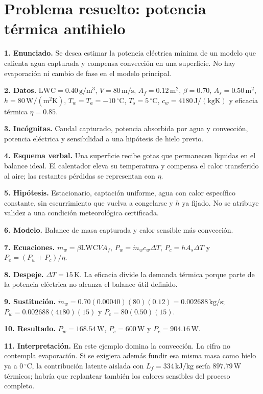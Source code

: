 \section{Problema resuelto: potencia térmica antihielo}
\textbf{1. Enunciado.} Se desea estimar la potencia eléctrica mínima de un modelo que calienta agua capturada y compensa convección en una superficie. No hay evaporación ni cambio de fase en el modelo principal.

\textbf{2. Datos.} $\mathrm{LWC}=0.40\,\mathrm{g/m^3}$, $V=80\,\mathrm{m/s}$, $A_f=0.12\,\mathrm{m^2}$, $\beta=0.70$, $A_s=0.50\,\mathrm{m^2}$, $h=80\,\mathrm{W/(m^2K)}$, $T_w=T_a=-10\,{}^\circ\mathrm{C}$, $T_s=5\,{}^\circ\mathrm{C}$, $c_w=4180\,\mathrm{J/(kgK)}$ y eficacia térmica $\eta=0.85$.

\textbf{3. Incógnitas.} Caudal capturado, potencia absorbida por agua y convección, potencia eléctrica y sensibilidad a una hipótesis de hielo previo.

\textbf{4. Esquema verbal.} Una superficie recibe gotas que permanecen líquidas en el balance ideal. El calentador eleva su temperatura y compensa el calor transferido al aire; las restantes pérdidas se representan con $\eta$.

\textbf{5. Hipótesis.} Estacionario, captación uniforme, agua con calor específico constante, sin escurrimiento que vuelva a congelarse y $h$ ya fijado. No se atribuye validez a una condición meteorológica certificada.

\textbf{6. Modelo.} Balance de masa capturada y calor sensible más convección.

\textbf{7. Ecuaciones.} $\dot m_w=\beta\mathrm{LWC}VA_f$, $P_w=\dot m_wc_w\Delta T$, $P_c=hA_s\Delta T$ y $P_e=(P_w+P_c)/\eta$.

\textbf{8. Despeje.} $\Delta T=15\,\mathrm{K}$. La eficacia divide la demanda térmica porque parte de la potencia eléctrica no alcanza el balance útil definido.

\textbf{9. Sustitución.} $\dot m_w=0.70(0.00040)(80)(0.12)=0.002688\,\mathrm{kg/s}$; $P_w=0.002688(4180)(15)$ y $P_c=80(0.50)(15)$.

\textbf{10. Resultado.} $P_w=168.54\,\mathrm{W}$, $P_c=600\,\mathrm{W}$ y $P_e=904.16\,\mathrm{W}$.

\textbf{11. Interpretación.} En este ejemplo domina la convección. La cifra no contempla evaporación. Si se exigiera además fundir esa misma masa como hielo ya a $0\,{}^\circ\mathrm{C}$, la contribución latente aislada con $L_f=334\,\mathrm{kJ/kg}$ sería $897.79\,\mathrm{W}$ térmicos; habría que replantear también los calores sensibles del proceso completo.

